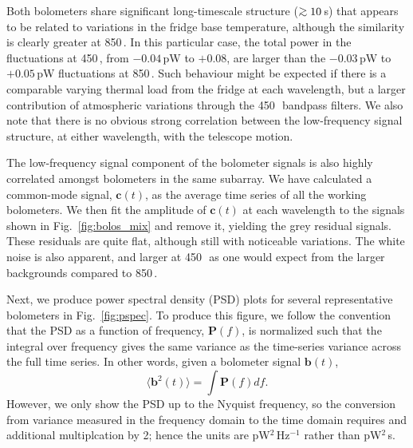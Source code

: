 \documentclass[useAMS,usenatbib,nofootinbib]{mn2e}
\def\gsim{\mathrel{\lower2.5pt\vbox{\lineskip=0pt\baselineskip=0pt
          \hbox{$>$}\hbox{$\sim$}}}}
\begin{document}
Both bolometers share significant long-timescale structure
($\gsim10$\,s) that appears to be related to variations in the fridge
base temperature, although the similarity is clearly greater at
850\,\micron. In this particular case, the total power in the
fluctuations at 450\,\micron, from $-0.04$\,pW to $+0.08$, are larger
than the $-0.03$\,pW to $+0.05$\,pW fluctuations at 850\,\micron. Such
behaviour might be expected if there is a comparable varying thermal
load from the fridge at each wavelength, but a larger contribution of
atmospheric variations through the 450\,\micron\ bandpass filters. We
also note that there is no obvious strong correlation between the
low-frequency signal structure, at either wavelength, with the
telescope motion.

The low-frequency signal component of the bolometer signals is also
highly correlated amongst bolometers in the same subarray. We have
calculated a common-mode signal, $\mathbf{c}(t)$, as the average time
series of all the working bolometers. We then fit the amplitude of
$\mathbf{c}(t)$ at each wavelength to the signals shown in
Fig.~\ref{fig:bolos_mix} and remove it, yielding the grey residual
signals. These residuals are quite flat, although still with
noticeable variations. The white noise is also apparent, and larger at
450\,\micron\ as one would expect from the larger backgrounds compared
to 850\,\micron.

Next, we produce power spectral density (PSD) plots for several
representative bolometers in Fig.~\ref{fig:pspec}. To produce this
figure, we follow the convention that the PSD as a function of
frequency, $\mathbf{P}(f)$, is normalized such that the integral over
frequency gives the same variance as the time-series variance across
the full time series. In other words, given a bolometer signal
$\mathbf{b}(t)$,
%
\begin{equation}
\label{eq:psd}
\langle\mathbf{b}^2(t)\rangle = \int \mathbf{P}(f) df .
\end{equation}
%
However, we only show the PSD up to the Nyquist frequency, so the
conversion from variance measured in the frequency domain to the time
domain requires and additional multiplcation by 2; hence the units are
pW$^2$\,Hz$^{-1}$ rather than pW$^2$\,s.
\end{document}
